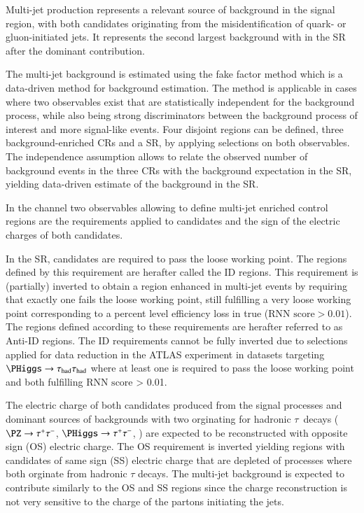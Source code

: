 \label{sec:hadhad_multijet}

Multi-jet production represents a relevant source of background in the
\hadhad signal region, with both \tauhadvis candidates originating
from the misidentification of quark- or gluon-initiated jets. It
represents the second largest background with \faketauhadvis in the
\hadhad SR after the dominant \ttbarFakes contribution.

The multi-jet background is estimated using the fake factor method
which is a data-driven method for background estimation. The method is
applicable in cases where two observables exist that are statistically
independent for the background process, while also being strong
discriminators between the background process of interest and more
signal-like events. Four disjoint regions can be defined, three
background-enriched CRs and a SR, by applying selections on both
observables. The independence assumption allows to relate the observed
number of background events in the three CRs with the background
expectation in the SR, yielding data-driven estimate of the background
in the SR.

In the \hadhad channel two observables allowing to define multi-jet
enriched control regions are the \tauid requirements applied to
\tauhadvis candidates and the sign of the electric charges of both
candidates.

In the \hadhad SR, \tauhadvis candidates are required to pass the
loose \tauid working point. The regions defined by this requirement
are herafter called the ID regions. This \tauid requirement is
(partially) inverted to obtain a region enhanced in multi-jet events
by requiring that exactly one \tauhadvis fails the loose \tauid
working point, still fulfilling a very loose working point
corresponding to a percent level efficiency loss in true \tauhad
($\text{RNN score} > 0.01$). The regions defined according to these
requirements are herafter referred to as Anti-ID regions. The ID
requirements cannot be fully inverted due to selections applied for
data reduction in the ATLAS experiment in datasets targeting
$\PHiggs \to \hadhad$ where at least one \tauhadvis is required to
pass the loose working point and both \tauhadvis fulfilling
$\text{RNN score}$ > 0.01.

The electric charge of both \tauhadvis candidates produced from the
signal processes and dominant sources of backgrounds with two
\tauhadvis orginating for hadronic $\tau$~decays ($\PZ \to \tautau$,
$\PHiggs \to \tautau$, \ttbar) are expected to be reconstructed with
opposite sign (OS) electric charge. The OS requirement is inverted
yielding regions with \tauhadvis candidates of same sign (SS) electric
charge that are depleted of processes where both \tauhadvis orginate
from hadronic $\tau$ decays. The multi-jet background is expected to
contribute similarly to the OS and SS regions since the \tauhadvis
charge reconstruction is not very sensitive to the charge of the
partons initiating the jets.

